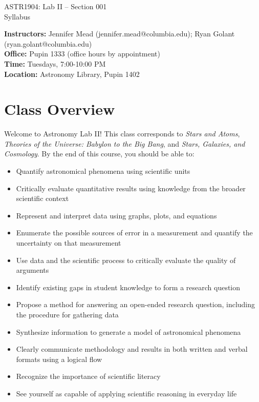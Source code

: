 \documentclass[11pt]{article}
\begin{document}
\begin{center}
\LARGE{ASTR1904: Lab II -- Section 001} \\ \medskip \Large{Syllabus}\\ 
\end{center}

\noindent
\textbf{Instructors:} Jennifer Mead (jennifer.mead@columbia.edu); Ryan Golant (ryan.golant@columbia.edu)\\
\textbf{Office:} Pupin 1333 (office hours by appointment)\\ 
\textbf{Time:} {Tuesdays, 7:00-10:00 PM} \\
\textbf{Location:} {Astronomy Library, Pupin 1402} \\

\section*{Class Overview}
Welcome to Astronomy Lab II! This class corresponds to \textit{Stars and Atoms}, \textit{Theories of the Universe: Babylon to the Big Bang}, and \textit{Stars, Galaxies, and Cosmology}.  By the end of this course, you should be able to:
\begin{itemize}
    \item Quantify astronomical phenomena using scientific units
    \item Critically evaluate quantitative results using knowledge from the broader scientific context
    \item Represent and interpret data using graphs, plots, and equations
    \item Enumerate the possible sources of error in a measurement and quantify the uncertainty on that measurement
    \item Use data and the scientific process to critically evaluate the quality of arguments
    \item Identify existing gaps in student knowledge to form a research question
    \item Propose a method for answering an open-ended research question, including the procedure for gathering data
    \item Synthesize information to generate a model of astronomical phenomena
    \item Clearly communicate methodology and results in both written and verbal formats using a logical flow
    \item Recognize the importance of scientific literacy
    \item See yourself as capable of applying scientific reasoning in everyday life
\end{itemize}
 
\end{document}
